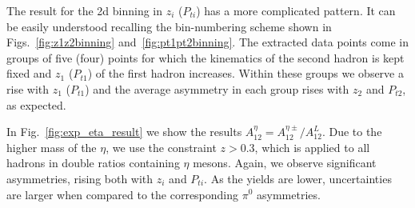 The result for the 2d binning in \(z_{i}\) (\(P_{ti}\)) has a more complicated pattern. It can be easily understood recalling the bin-numbering scheme shown in Figs.~\ref{fig:z1z2binning} and~\ref{fig:pt1pt2binning}. The extracted data points come in groups of five (four) points for which the kinematics of the second hadron is kept fixed and $z_1$ ($P_{t1}$) of the first hadron increases. Within these groups we observe a rise with $z_1$ ($P_{t1}$) and the average asymmetry in each group rises with $z_2$ and $P_{t2}$, as expected.


In Fig.~\ref{fig:exp_eta_result} we show the results $A_{12}^{\eta}=A_{12}^{\eta \pm}/A_{12}^L$. Due to the higher mass of the $\eta$, we use the constraint $z> 0.3$, which is applied to all hadrons in double ratios containing $\eta$ mesons. Again, we observe significant asymmetries, rising both with \(z_i\) and \(P_{ti}\).  As the yields are lower, uncertainties are larger when compared to the corresponding $\pi^0$ asymmetries. 

